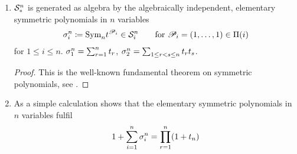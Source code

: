 \begin{LemDef}
\begin{enumerate}
\begin{proof}
      as a sum of symmetrised polynomials.
    \end{proof}
  \item $\mathcal{S}^{n}_*$ is generated as algebra by the algebraically
    independent, elementary symmetric polynomials in $n$ variables
    \begin{gather*}
      \sigma_{i}^{n}\coloneqq \text{\normalfont Sym}_{n} t^{\mathscr{P}_i}
      \in \mathcal{S}^{n}_i
      \qquad \text{for }
      \mathscr{P}_i = (1,\dotsc,1)
      \in \Pi({i})
    \end{gather*}
    for $1\leq i\leq n$.
    \Forexample
    $\sigma_{1}^{n}=\sum_{r=1}^{n}t_r$,
    $\sigma_{2}^{n}=\sum_{1\leq r<s\leq n} t_r t_s$.
    \begin{proof}
      This is the well-known fundamental theorem on symmetric
      polynomials, see \forexample
      \cite[Chap.~4.4, Satz~1]{bosch2013algebra}. 
    \end{proof}
  \item As a simple calculation shows that the elementary symmetric
    polynomials in $n$ variables fulfil
    \begin{gather}\label{eq:sumelemsymmpoly}
      1 + \sum_{i=1}^{n} \sigma_{i}^{n}
      = \prod_{r=1}^{n}(1+t_n)
    \end{gather}
  \end{enumerate}
\end{LemDef}

